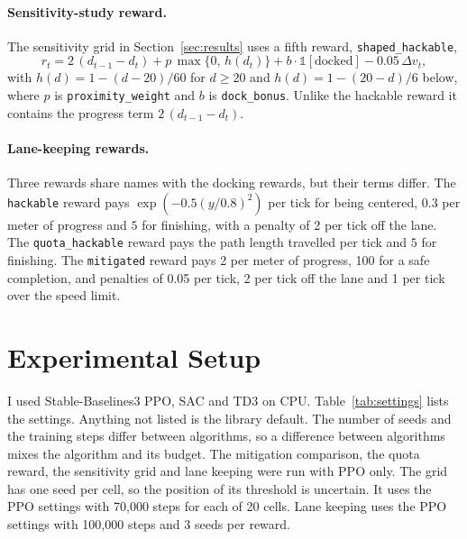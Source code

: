 \documentclass[11pt]{article}
\begin{document}
\paragraph{Sensitivity-study reward.} The sensitivity grid in Section~\ref{sec:results} uses a
fifth reward, \texttt{shaped\_hackable},
\begin{equation}
r_t = 2\,(d_{t-1}-d_t) + p\,\max\{0,\,h(d_t)\} + b\cdot\mathbb 1[\text{docked}] - 0.05\,\Delta v_t,
\end{equation}
with $h(d)=1-(d-20)/60$ for $d\ge20$ and $h(d)=1-(20-d)/6$ below, where $p$ is
\texttt{proximity\_weight} and $b$ is \texttt{dock\_bonus}. Unlike the hackable
reward it contains the progress term $2\,(d_{t-1}-d_t)$.

\paragraph{Lane-keeping rewards.} Three rewards share names with the docking
rewards, but their terms differ. The \texttt{hackable} reward pays
$\exp(-0.5(y/0.8)^2)$ per tick for being centered, $0.3$ per meter of progress
and $5$ for finishing, with a penalty of 2 per tick off the lane. The
\texttt{quota\_hackable} reward pays the path length travelled per tick and $5$
for finishing. The \texttt{mitigated} reward pays 2 per meter of progress, 100
for a safe completion, and penalties of 0.05 per tick, 2 per tick off the lane
and 1 per tick over the speed limit.

\section{Experimental Setup}
\label{sec:setup}

I used Stable-Baselines3 PPO, SAC and TD3 on CPU. Table~\ref{tab:settings}
lists the settings. Anything not listed is the library default. The number of
seeds and the training steps differ between algorithms, so a difference between
algorithms mixes the algorithm and its budget. The mitigation comparison, the
quota reward, the sensitivity grid and lane keeping were run with PPO only. The
grid has one seed per cell, so the position of its threshold is uncertain. It
uses the PPO settings with 70,000 steps for each of 20 cells. Lane keeping uses
the PPO settings with 100,000 steps and 3 seeds per reward.
\end{document}
